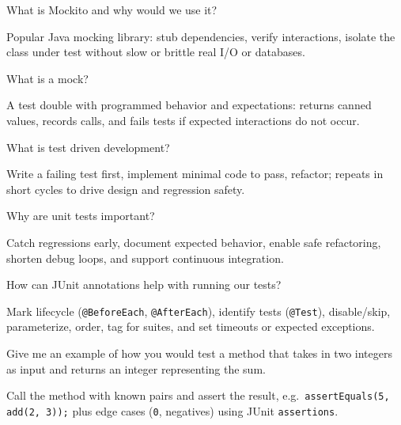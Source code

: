



\question[4]
What is Mockito and why would we use it?
\begin{solutionorbox}[1.25in]
  Popular Java mocking library: stub dependencies, verify interactions, isolate the class under test without slow or brittle real I/O or databases.
\end{solutionorbox}

\question[4]
What is a mock?
\begin{solutionorbox}[1.05in]
  A test double with programmed behavior and expectations: returns canned values, records calls, and fails tests if expected interactions do not occur.
\end{solutionorbox}

\question[4]
What is test driven development?
\begin{solutionorbox}[1.2in]
  Write a failing test first, implement minimal code to pass, refactor; repeats in short cycles to drive design and regression safety.
\end{solutionorbox}

\question[4]
Why are unit tests important?
\begin{solutionorbox}[1.25in]
  Catch regressions early, document expected behavior, enable safe refactoring, shorten debug loops, and support continuous integration.
\end{solutionorbox}

\question[4]
How can JUnit annotations help with running our tests?
\begin{solutionorbox}[1.35in]
  Mark lifecycle (\texttt{@BeforeEach}, \texttt{@AfterEach}), identify tests (\texttt{@Test}), disable/skip, parameterize, order, tag for suites, and set timeouts or expected exceptions.
\end{solutionorbox}

\question[4]
Give me an example of how you would test a method that takes in two integers as input and returns an integer representing the sum.
\begin{solutionorbox}[1.55in]
  Call the method with known pairs and assert the result, e.g.\ \texttt{assertEquals(5, add(2, 3));} plus edge cases (\texttt{0}, negatives) using JUnit \texttt{assertions}.
\end{solutionorbox}

